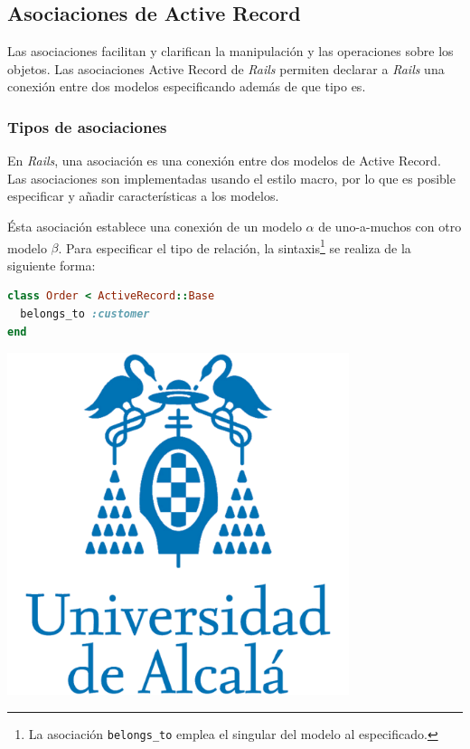 \subsection{Asociaciones de Active Record}

Las asociaciones facilitan y clarifican la manipulación y las operaciones sobre los objetos. Las asociaciones Active Record de \textit{Rails} permiten declarar a \textit{Rails} una conexión entre dos modelos especificando además de que tipo es.

\subsubsection{Tipos de asociaciones}
En \textit{Rails}, una asociación es una conexión entre dos modelos de Active Record. Las asociaciones son implementadas usando el estilo macro, por lo que es posible especificar y añadir características a los modelos.

Ésta asociación establece una conexión de un modelo $\alpha$ de uno-a-muchos con otro modelo $\beta$. Para especificar el tipo de relación, la sintaxis\footnote{La asociación \texttt{belongs\_to} emplea el singular del modelo al especificado.} se realiza de la siguiente forma:

\begin{lstlisting}[language=Ruby]
class Order < ActiveRecord::Base
  belongs_to :customer
end
\end{lstlisting}

\includegraphics[width=10cm]{./image/logos/uahlogo3.png}

